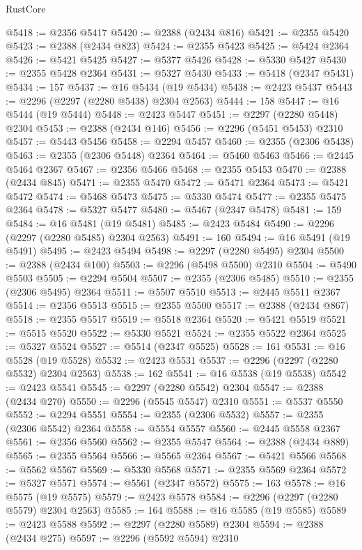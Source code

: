 \begin{lexlean}{RustCore}
\begin{coremodule}
@5418 := @2356 @5417
@5420 := @2388 (@2434 @816)
@5421 := @2355 @5420
@5423 := @2388 (@2434 @823)
@5424 := @2355 @5423
@5425 := @5424 @2364
@5426 := @5421 @5425
@5427 := @5377 @5426
@5428 := @5330 @5427
@5430 := @2355 @5428 @2364
@5431 := @5327 @5430
@5433 := @5418 (@2347 @5431)
@5434 := 157
@5437 := @16 @5434 (@19 @5434)
@5438 := @2423 @5437
@5443 := @2296 (@2297 (@2280 @5438) @2304 @2563)
@5444 := 158
@5447 := @16 @5444 (@19 @5444)
@5448 := @2423 @5447
@5451 := @2297 (@2280 @5448) @2304
@5453 := @2388 (@2434 @146)
@5456 := @2296 (@5451 @5453) @2310
@5457 := @5443 @5456
@5458 := @2294 @5457
@5460 := @2355 (@2306 @5438)
@5463 := @2355 (@2306 @5448) @2364
@5464 := @5460 @5463
@5466 := @2445 @5464 @2367
@5467 := @2356 @5466
@5468 := @2355 @5453
@5470 := @2388 (@2434 @845)
@5471 := @2355 @5470
@5472 := @5471 @2364
@5473 := @5421 @5472
@5474 := @5468 @5473
@5475 := @5330 @5474
@5477 := @2355 @5475 @2364
@5478 := @5327 @5477
@5480 := @5467 (@2347 @5478)
@5481 := 159
@5484 := @16 @5481 (@19 @5481)
@5485 := @2423 @5484
@5490 := @2296 (@2297 (@2280 @5485) @2304 @2563)
@5491 := 160
@5494 := @16 @5491 (@19 @5491)
@5495 := @2423 @5494
@5498 := @2297 (@2280 @5495) @2304
@5500 := @2388 (@2434 @100)
@5503 := @2296 (@5498 @5500) @2310
@5504 := @5490 @5503
@5505 := @2294 @5504
@5507 := @2355 (@2306 @5485)
@5510 := @2355 (@2306 @5495) @2364
@5511 := @5507 @5510
@5513 := @2445 @5511 @2367
@5514 := @2356 @5513
@5515 := @2355 @5500
@5517 := @2388 (@2434 @867)
@5518 := @2355 @5517
@5519 := @5518 @2364
@5520 := @5421 @5519
@5521 := @5515 @5520
@5522 := @5330 @5521
@5524 := @2355 @5522 @2364
@5525 := @5327 @5524
@5527 := @5514 (@2347 @5525)
@5528 := 161
@5531 := @16 @5528 (@19 @5528)
@5532 := @2423 @5531
@5537 := @2296 (@2297 (@2280 @5532) @2304 @2563)
@5538 := 162
@5541 := @16 @5538 (@19 @5538)
@5542 := @2423 @5541
@5545 := @2297 (@2280 @5542) @2304
@5547 := @2388 (@2434 @270)
@5550 := @2296 (@5545 @5547) @2310
@5551 := @5537 @5550
@5552 := @2294 @5551
@5554 := @2355 (@2306 @5532)
@5557 := @2355 (@2306 @5542) @2364
@5558 := @5554 @5557
@5560 := @2445 @5558 @2367
@5561 := @2356 @5560
@5562 := @2355 @5547
@5564 := @2388 (@2434 @889)
@5565 := @2355 @5564
@5566 := @5565 @2364
@5567 := @5421 @5566
@5568 := @5562 @5567
@5569 := @5330 @5568
@5571 := @2355 @5569 @2364
@5572 := @5327 @5571
@5574 := @5561 (@2347 @5572)
@5575 := 163
@5578 := @16 @5575 (@19 @5575)
@5579 := @2423 @5578
@5584 := @2296 (@2297 (@2280 @5579) @2304 @2563)
@5585 := 164
@5588 := @16 @5585 (@19 @5585)
@5589 := @2423 @5588
@5592 := @2297 (@2280 @5589) @2304
@5594 := @2388 (@2434 @275)
@5597 := @2296 (@5592 @5594) @2310

\end{coremodule}
\end{lexlean}
